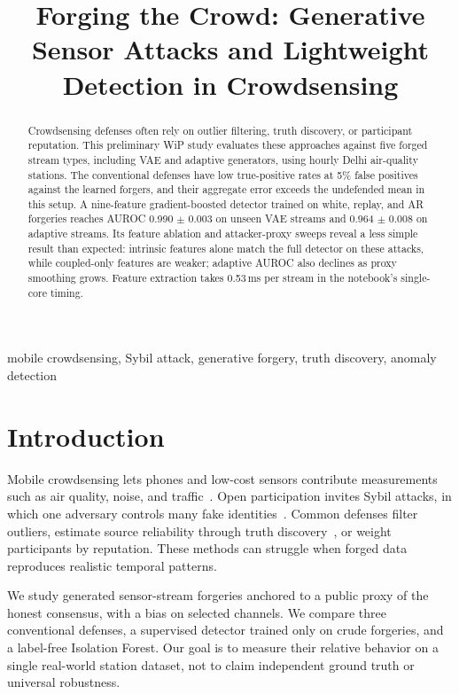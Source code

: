 \documentclass[conference]{IEEEtran}
\begin{document}
\title{Forging the Crowd: Generative Sensor Attacks and Lightweight Detection in Crowdsensing}
\author{
}
\maketitle
\begin{abstract}
Crowdsensing defenses often rely on outlier filtering, truth discovery, or participant reputation. This preliminary WiP study evaluates these approaches against five forged stream types, including VAE and adaptive generators, using hourly Delhi air-quality stations. The conventional defenses have low true-positive rates at 5\% false positives against the learned forgers, and their aggregate error exceeds the undefended mean in this setup. A nine-feature gradient-boosted detector trained on white, replay, and AR forgeries reaches AUROC 0.990 $\pm$ 0.003 on unseen VAE streams and 0.964 $\pm$ 0.008 on adaptive streams. Its feature ablation and attacker-proxy sweeps reveal a less simple result than expected: intrinsic features alone match the full detector on these attacks, while coupled-only features are weaker; adaptive AUROC also declines as proxy smoothing grows. Feature extraction takes 0.53\,ms per stream in the notebook's single-core timing.
\end{abstract}
\begin{IEEEkeywords}
mobile crowdsensing, Sybil attack, generative forgery, truth discovery, anomaly detection
\end{IEEEkeywords}
\section{Introduction}
Mobile crowdsensing lets phones and low-cost sensors contribute measurements such as air quality, noise, and traffic~\cite{ganti2011}. Open participation invites Sybil attacks, in which one adversary controls many fake identities~\cite{douceur2002}. Common defenses filter outliers, estimate source reliability through truth discovery~\cite{li2014crh,li2016survey}, or weight participants by reputation. These methods can struggle when forged data reproduces realistic temporal patterns.

We study generated sensor-stream forgeries anchored to a public proxy of the honest consensus, with a bias on selected channels. We compare three conventional defenses, a supervised detector trained only on crude forgeries, and a label-free Isolation Forest. Our goal is to measure their relative behavior on a single real-world station dataset, not to claim independent ground truth or universal robustness.
\end{document}

